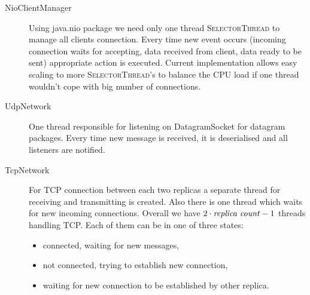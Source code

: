 \begin{description}
	\item[NioClientManager] \hfill

		Using java.nio package we need only one thread \textsc{SelectorThread} to manage all clients connection. Every time new event occurs (incoming connection waits for accepting, data received from client, data ready to be sent) appropriate action is executed. Current implementation allows easy scaling to more \textsc{SelectorThread}'s to balance the CPU load if one thread wouldn't cope with big number of connections.

	\item[UdpNetwork] \hfill

		One thread responsible for listening on DatagramSocket for datagram packages. Every time new message is received, it is deserialised and all listeners are notified. 

	\item[TcpNetwork] \hfill

		For TCP connection between each two replicas a separate thread for receiving and transmitting is created. Also there is one thread which waits for new incoming connections. Overall we have  $2 \cdot \text{\textit{replica count}} - 1$ threads handling TCP. Each of them can be in one of three states:
		\begin{itemize}
			\item connected, waiting for new messages,
			\item not connected, trying to establish new connection,
			\item waiting for new connection to be established by other replica.
		\end{itemize}
\end{description}

